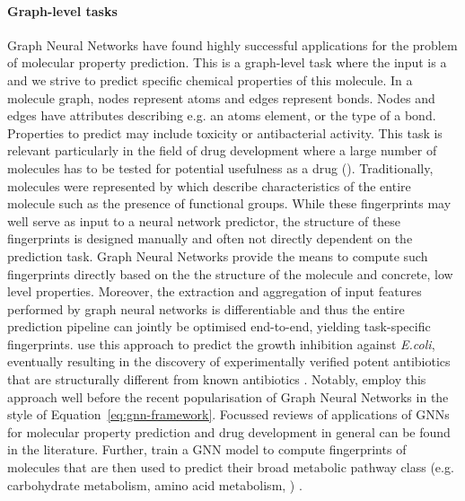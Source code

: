 \documentclass[
	fontsize=10pt, %
	twoside=false, %
	secnumdepth=1, %
  toc=indentunnumbered %
]{kaobook}
\begin{document}
\paragraph{Graph-level tasks} Graph Neural Networks have found highly successful
applications for the problem of molecular property prediction. This is a
graph-level task where the input is a  and we strive to
predict specific chemical properties of this molecule. In a molecule graph,
nodes represent atoms and edges represent bonds. Nodes and edges have attributes
describing e.g. an atoms element, or the type of a bond. Properties to predict
may include toxicity or antibacterial activity. This task is relevant
particularly in the field of drug development where a large number of molecules
has to be tested for potential usefulness as a drug ().
%
Traditionally, molecules were represented by  which
describe characteristics of the entire molecule such as the presence of
functional groups. While these fingerprints may well serve as input to a neural
network predictor, the structure of these fingerprints is designed manually and
often not directly dependent on the prediction task.
Graph Neural Networks provide the means to compute such fingerprints directly
based on the the structure of the molecule and concrete, low level properties.
Moreover, the extraction and aggregation of input features performed by graph
neural networks is differentiable and thus the entire prediction pipeline can
jointly be optimised end-to-end, yielding task-specific fingerprints.
\citeauthor{stokes_DeepLearningApproach_2020} use this approach to predict the
growth inhibition against \textit{E.coli}, eventually resulting in the discovery
of experimentally verified potent antibiotics that are structurally different
from known antibiotics \cite{stokes_DeepLearningApproach_2020}.
%
Notably, \citeauthor{duvenaud_convolutional_2015} employ this approach well
before the recent popularisation of Graph Neural Networks in the style of  
Equation~\ref{eq:gnn-framework}.
Focussed reviews of applications of GNNs for molecular property prediction
\cite{wieder_CompactReviewMolecular_2020}
and drug development in general
\cite{gaudelet_utilising_2020}
can be found in the literature.
%
Further, \citeauthor{baranwal_deep_2020} train a GNN model to compute
fingerprints of molecules that are then used to predict their broad metabolic
pathway class (e.g. carbohydrate metabolism, amino acid metabolism, \etc)
\cite{baranwal_deep_2020}.
\end{document}
